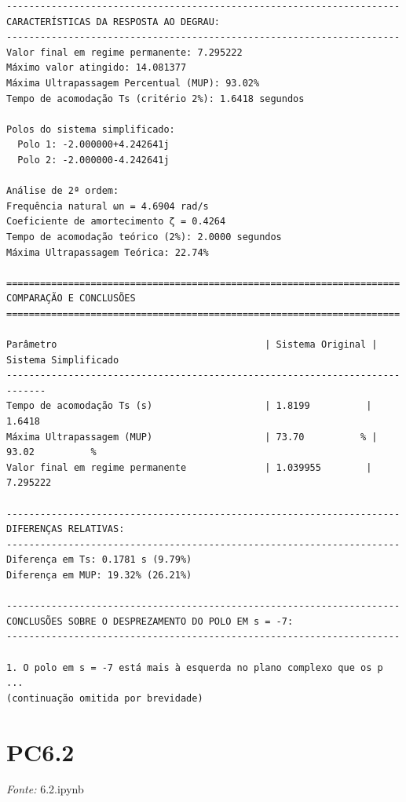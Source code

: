 \documentclass[12pt,a4paper]{article}
\begin{document}
\begin{lstlisting}
----------------------------------------------------------------------
CARACTERÍSTICAS DA RESPOSTA AO DEGRAU:
----------------------------------------------------------------------
Valor final em regime permanente: 7.295222
Máximo valor atingido: 14.081377
Máxima Ultrapassagem Percentual (MUP): 93.02%
Tempo de acomodação Ts (critério 2%): 1.6418 segundos

Polos do sistema simplificado:
  Polo 1: -2.000000+4.242641j
  Polo 2: -2.000000-4.242641j

Análise de 2ª ordem:
Frequência natural ωn = 4.6904 rad/s
Coeficiente de amortecimento ζ = 0.4264
Tempo de acomodação teórico (2%): 2.0000 segundos
Máxima Ultrapassagem Teórica: 22.74%

======================================================================
COMPARAÇÃO E CONCLUSÕES
======================================================================

Parâmetro                                     | Sistema Original | Sistema Simplificado
-----------------------------------------------------------------------------
Tempo de acomodação Ts (s)                    | 1.8199          | 1.6418         
Máxima Ultrapassagem (MUP)                    | 73.70          % | 93.02          %
Valor final em regime permanente              | 1.039955        | 7.295222       

----------------------------------------------------------------------
DIFERENÇAS RELATIVAS:
----------------------------------------------------------------------
Diferença em Ts: 0.1781 s (9.79%)
Diferença em MUP: 19.32% (26.21%)

----------------------------------------------------------------------
CONCLUSÕES SOBRE O DESPREZAMENTO DO POLO EM s = -7:
----------------------------------------------------------------------

1. O polo em s = -7 está mais à esquerda no plano complexo que os p
...
(continuação omitida por brevidade)
\end{lstlisting}

\clearpage
\section*{PC6.2}
\noindent\textit{Fonte:} 6.2.ipynb
\vspace{0.4cm}
\end{document}
